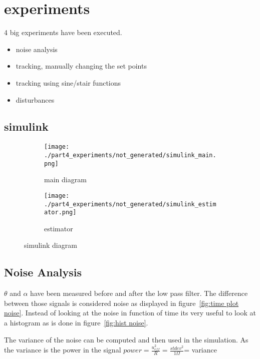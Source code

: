 \section{experiments}

	4 big experiments have been executed.
	
	\begin{itemize}
		\item noise analysis
		\item tracking, manually changing the set points
		\item tracking using sine/stair functions
		\item disturbances
	\end{itemize}

\subsection{simulink}
	\begin{figure}[H]
	\centering
	\begin{subfigure}[b]{0.45\textwidth}
		\texttt{[image: ./part4\_experiments/not\_generated/simulink\_main.png]}
		\caption{main diagram}
	\end{subfigure}
	\begin{subfigure}[b]{0.45\textwidth}
		\texttt{[image: ./part4\_experiments/not\_generated/simulink\_estimator.png]}
		\caption{estimator}
	\end{subfigure}
	\caption{simulink diagram}
\end{figure}
\subsection{Noise Analysis}
	$\theta$ and $\alpha$ have been measured before and after the low pass filter. The difference between those signals is considered noise as displayed in figure~\ref{fig:time plot noise}. Instead of looking at the noise in function of time its very useful to look at a histogram as is done in figure~\ref{fig:hist noise}.
	
	The variance of the noise can be computed and then used in the simulation. As the variance is the power in the signal $power = \frac{u_{eff}^2}{R} = \frac{stdev^2}{1 \Omega}$= variance
	
	
	
